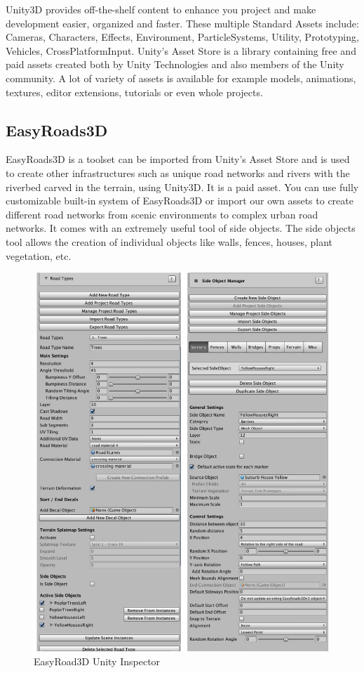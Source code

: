 \par
Unity3D\cite{unity3d} provides off-the-shelf content to enhance you project and make development easier, organized and faster. These multiple Standard Assets include: Cameras, Characters, Effects, Environment, ParticleSystems, Utility, Prototyping, Vehicles, CrossPlatformInput. Unity’s Asset Store is a library containing free and paid assets created both by Unity Technologies and also members of the Unity community. A lot of variety of assets is available for example models, animations, textures, editor extensions, tutorials or even whole projects.

\subsection{EasyRoads3D}
EasyRoads3D\cite{easyroads3d} is a toolset can be imported from Unity's Asset Store and is used to create other infrastructures such as unique road networks and rivers with the riverbed carved in the terrain, using Unity3D. It is a paid asset. You can use fully customizable built-in system of EasyRoads3D or import our own assets to create different road networks from scenic environments to complex urban road networks. It comes with an extremely useful tool of side objects. The side objects tool allows the creation of individual objects like walls, fences, houses, plant vegetation, etc.

\begin{figure}[H]
  \centering
  \includegraphics[scale=0.50]{images/Chapter4/easyroad3d.png}
  \caption{EasyRoad3D Unity Inspector}
  \label{fig:remote_ssh}
\end{figure}

